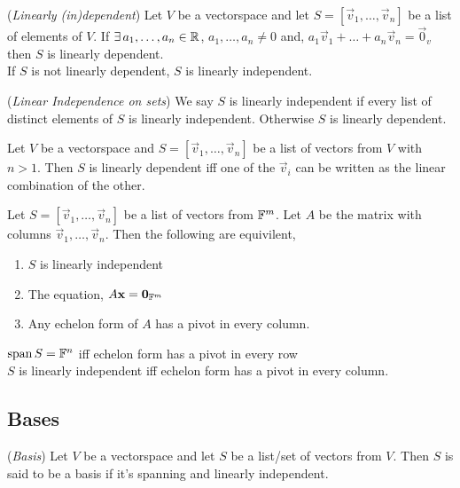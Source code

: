\documentclass{article}
\begin{document}
\begin{ndefi}{(\textit{Linearly (in)dependent})}
  Let $V$ be a vectorspace and let $S = [\vec v_1,\dots,\vec v_n]$ be a list of elements of $V$. If $\exists\, a_1, \dots, a_n \in \mathbb{R}$, $a_1, \dots, a_n \ne 0$ and, $a_1\vec v_1 + \dots + a_n\vec v_n = \vec 0_v$ then $S$ is linearly dependent.\\

  If $S$ is not linearly dependent, $S$ is linearly independent.
\end{ndefi}

\begin{ndefi}{(\textit{Linear Independence on sets})}
  We say $S$ is linearly independent if every list of distinct elements of $S$ is linearly independent. Otherwise $S$ is linearly dependent.
\end{ndefi}

\begin{nthm}
  Let $V$ be a vectorspace and $S = [\vec v_1, \dots, \vec v_n]$ be a list of vectors from $V$ with $n > 1$. Then $S$ is linearly dependent iff one of the $\vec v_i$ can be written as the linear combination of the other.
\end{nthm}

\begin{nlemma}
  Let $S = [\vec v_1, \dots, \vec v_n]$ be a list of vectors from $\mathbb{F}^m$. Let $A$ be the matrix with columns $\vec v_1, \dots, \vec v_n$. Then the following are equivilent,
  \begin{enumerate}
    \item $S$ is linearly independent
    \item The equation, $A\boldsymbol{\mathbf{x}} = \boldsymbol{\mathbf{0}}_{\mathbb{F}^m}$
    \item Any echelon form of $A$ has a pivot in every column.
  \end{enumerate}
\end{nlemma}

\begin{remark}
  $\operatorname{span} S = \mathbb{F}^n$ iff echelon form has a pivot in every row\\
  $S$ is linearly independent iff echelon form has a pivot in every column.
\end{remark}

\subsection{Bases}
\begin{ndefi}{(\textit{Basis})}
  Let $V$ be a vectorspace and let $S$ be a list/set of vectors from $V$. Then $S$ is said to be a basis if it's spanning and linearly independent.
\end{ndefi}
\end{document}
